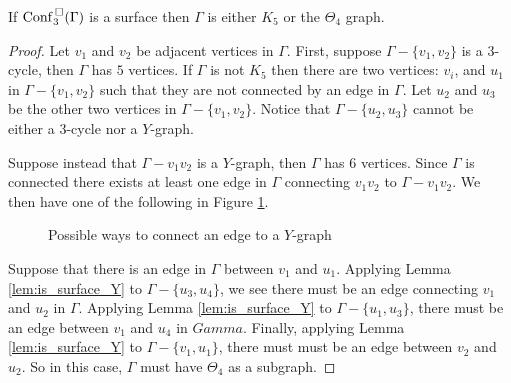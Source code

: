 \begin{thm}
    If \(\mathrm{Conf}^{\,\square}_3(\Gamma)\) is a surface then \(\Gamma\) is either \(K_5\) or the \(\Theta_4\) graph.
\end{thm}
\begin{proof}
    Let \(v_1\) and \(v_2\) be adjacent vertices in \(\Gamma\).
    First, suppose \(\Gamma - \{v_1, v_2\}\) is a \(3\)-cycle, then \(\Gamma\) has \(5\) vertices.
    If \(\Gamma\) is not \(K_5\) then there are two vertices: \(v_i\), and \(u_1\) in \(\Gamma - \{v_1, v_2\}\)
    such that they are not connected by an edge in \(\Gamma\).
    Let \(u_2\) and \(u_3\) be the other two vertices in \(\Gamma - \{v_1, v_2\}\).
    Notice that \(\Gamma - \{u_2, u_3\}\) cannot be either a \(3\)-cycle nor a \(Y\)-graph.

    Suppose instead that \(\Gamma - v_1 v_2\) is a \(Y\)-graph, then \(\Gamma\) has \(6\) vertices.
    Since \(\Gamma\) is connected there exists at least one edge in \(\Gamma\) connecting \(v_1 v_2\) to \(\Gamma - v_1 v_2\).
    We then have one of the following in Figure \ref{fig:edgeygraphconnections}.
    \begin{figure}
        \centering
        \quad
        \caption{Possible ways to connect an edge to a \(Y\)-graph}
        \label{fig:edgeygraphconnections}
    \end{figure}

    Suppose that there is an edge in \(\Gamma\) between \(v_1\) and \(u_1\).
    Applying Lemma \ref{lem:is_surface_Y} to \(\Gamma - \{u_3, u_4\}\), we see there must be an edge
    connecting \(v_1\) and \(u_2\) in \(\Gamma\).
    Applying Lemma \ref{lem:is_surface_Y} to \(\Gamma - \{u_1, u_3\}\), there must be an edge between
    \(v_1\) and \(u_4\) in \(Gamma\).
    Finally, applying Lemma \ref{lem:is_surface_Y} to \(\Gamma - \{v_1, u_1\}\), there must must be
    an edge between \(v_2\) and \(u_2\).
    So in this case, \(\Gamma\) must have \(\Theta_4\) as a subgraph.


\end{proof}
